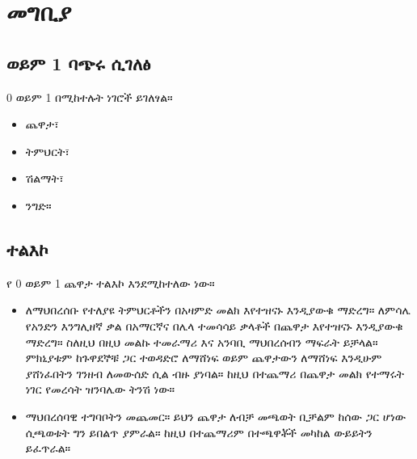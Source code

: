 \documentclass[a4paper,12pt]{article}
\newenvironment{geez}{\geezfont}{}
\begin{document}
\section{\begin{geez}መግቢያ\end{geez}}
\label{s:1}
\subsection{\begin{geez}0 ወይም 1 ባጭሩ ሲገለፅ\end{geez}}
0 ወይም 1 በሚከተሉት ነገሮች ይገለፃል።
\begin{itemize}
\item ጨዋታ፣
\item ትምህርት፣
\item ሽልማት፣
\item ንግድ።
\end{itemize}
\subsection{\begin{geez}ተልእኮ\end{geez}}
የ 0 ወይም 1 ጨዋታ ተልእኮ እንደሚከተለው ነው። 
\begin{itemize}
\item ለማህበረሰቡ የተለያዩ ትምህርቶችን በአዛምድ መልክ እየተዝናኑ እንዲያውቁ ማድረግ። ለምሳሌ የአንድን እንግሊዘኛ ቃል በአማርኛና በሌላ ተመሳሳይ ቃላቶች በጨዋታ እየተዝናኑ እንዲያውቁ ማድረግ። ስለዚህ በዚህ መልኩ ተመራማሪ እና አንባቢ ማህበረሰብን ማፍራት ይቻላል። ምክኒያቱም ከጉዋደኞቹ ጋር ተወዳድሮ ለማሸነፍ ወይም ጨዋታውን ለማሸነፍ እንዲሁም ያሸነፈበትን ገንዘብ ለመውሰድ ሲል ብዙ ያነባል። ከዚህ በተጨማሪ በጨዋታ መልክ የተማሩት ነገር የመረሳት ዝንባሌው ትንሽ ነው።
\item ማህበረሰባዊ ተግባቦትን መጨመር። ይህን ጨዋታ ለብቻ መጫወት ቢቻልም ከሰው ጋር ሆነው ሲጫወቱት ግን ይበልጥ ያምራል። ከዚህ በተጨማሪም በተጫዋቾች መካከል ውይይትን ይፈጥራል።
\end{itemize}
\end{document}

